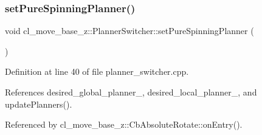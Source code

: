 \subsubsection{\texorpdfstring{set\+Pure\+Spinning\+Planner()}{setPureSpinningPlanner()}}
{\footnotesize\ttfamily void cl\+\_\+move\+\_\+base\+\_\+z\+::\+Planner\+Switcher\+::set\+Pure\+Spinning\+Planner (\begin{DoxyParamCaption}{ }\end{DoxyParamCaption})}



Definition at line 40 of file planner\+\_\+switcher.\+cpp.



References desired\+\_\+global\+\_\+planner\+\_\+, desired\+\_\+local\+\_\+planner\+\_\+, and update\+Planners().



Referenced by cl\+\_\+move\+\_\+base\+\_\+z\+::\+Cb\+Absolute\+Rotate\+::on\+Entry().


